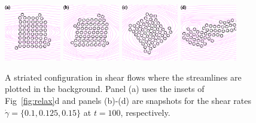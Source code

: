 \documentclass[aps,prl,preprint,groupedaddress]{revtex4-2}
\begin{document}
\begin{figure}
  \begin{center}
  \includegraphics[width=0.22\textwidth]{CS_0.pdf}
  \includegraphics[width=0.22\textwidth]{CS_1.pdf}
  \includegraphics[width=0.22\textwidth]{CS_2.pdf} 
    \includegraphics[width=0.22\textwidth]{CS_3.pdf} 
  \end{center}
  \vspace{-20pt}  
  \caption{\label{fig:BC3_shear_flow} A striated configuration in shear flows where the streamlines are plotted in the background. Panel (a) uses the insets of Fig~\ref{fig:relax}d and panels (b)-(d) are snapshots for the shear rates $\dot\gamma=\{0.1, 0.125, 0.15\}$ at $t=100$, respectively. 
  }
\end{figure}
\end{document}
